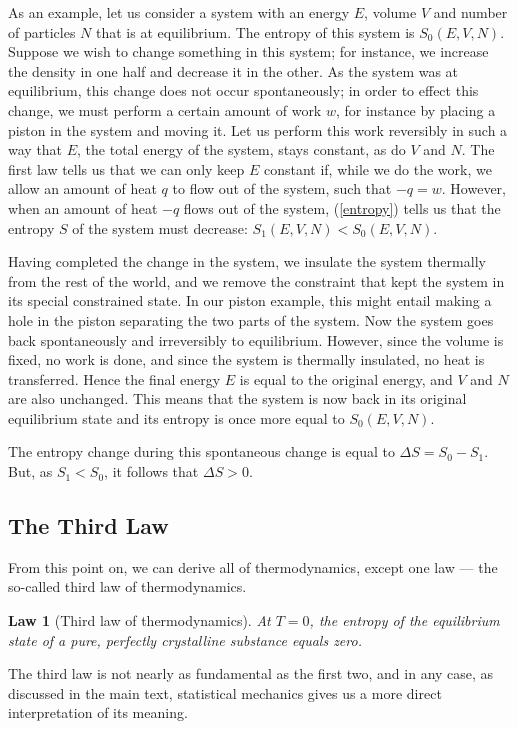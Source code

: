 \documentclass{article}
\theoremstyle{plain}\theoremheaderfont{\normalfont\bfseries}\theorembodyfont{\rmfamily}\theoremseparator{.}\newtheorem*{thm}{Theorem}\newtheorem*{law}{Law}\newtheorem*{pos}{Postulate}
\numberwithin{equation}{section}
\begin{document}
    As an example, let us consider a system with an energy \(E\), volume \(V\) and number of particles \(N\) that is at equilibrium. The entropy of this system is \(S_0(E,V,N)\). Suppose we wish to change something in this system; for instance, we increase the density in one half and decrease it in the other. As the system was at equilibrium, this change does not occur spontaneously; in order to effect this change, we must perform a certain amount of work \(w\), for instance by placing a piston in the system and moving it. Let us perform this work reversibly in such a way that \(E\), the total energy of the system, stays constant, as do \(V\) and \(N\). The first law tells us that we can only keep \(E\) constant if, while we do the work, we allow an amount of heat \(q\) to flow out of the system, such that \(-q=w\). However, when an amount of heat \(-q\) flows out of the system, (\ref{entropy}) tells us that the entropy \(S\) of the system must decrease: \(S_1(E,V,N)<S_0(E,V,N)\).
    
    Having completed the change in the system, we insulate the system thermally from the rest of the world, and we remove the constraint that kept the system in its special constrained state. In our piston example, this might entail making a hole in the piston separating the two parts of the system. Now the system goes back spontaneously and irreversibly to equilibrium. However, since the volume is fixed, no work is done, and since the system is thermally insulated, no heat is transferred. Hence the final energy \(E\) is equal to the original energy, and \(V\) and \(N\) are also unchanged. This means that the system is now back in its original equilibrium state and its entropy is once more equal to \(S_0(E,V,N)\).

    The entropy change during this spontaneous change is equal to \(\Delta S=S_0-S_1\). But, as \(S_1<S_0\), it follows that \(\Delta S > 0\).

    \subsection{The Third Law}
    From this point on, we can derive all of thermodynamics, except one law --- the so-called third law of thermodynamics.
    \begin{law}[Third law of thermodynamics]
        At \(T=0\), the entropy of the equilibrium state of a pure, perfectly crystalline substance equals zero.
    \end{law}
    The third law is not nearly as fundamental as the first two, and in any case, as discussed in the main text, statistical mechanics gives us a more direct interpretation of its meaning.
\end{document}
